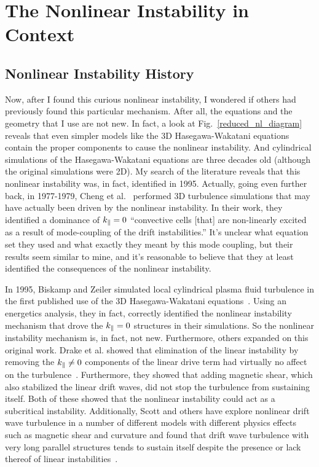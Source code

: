 \section{The Nonlinear Instability in Context}
\label{s_nl_inst_context}

\subsection{Nonlinear Instability History}
\label{ss_nl_history}

Now, after I found this curious nonlinear instability, I wondered if others had previously found this particular mechanism. 
After all, the equations and the geometry that I use are not new. In fact, a look at 
Fig.~\ref{reduced_nl_diagram} reveals that even simpler models like the 3D Hasegawa-Wakatani equations~\cite{hasegawa1983} contain the proper components to cause the nonlinear instability. And 
cylindrical simulations of the Hasegawa-Wakatani equations are three decades old (although the original simulations were 2D).
My search of the literature reveals that this nonlinear instability was, in fact, identified in 1995. Actually, going even further back, in 1977-1979, 
Cheng et al.~\cite{cheng1977,cheng1979} performed 3D turbulence simulations that may have actually been driven by the nonlinear instability. 
In their work, they identified a dominance of $k_\parallel=0$ ``convective cells [that] are non-linearly excited as a result of mode-coupling of the drift instabilities.'' 
It's unclear what equation set they used
and what exactly they meant by this mode coupling, but their results seem similar to mine, and it's reasonable to believe that they at least identified the consequences of the nonlinear instability.

In 1995, Biskamp and Zeiler simulated local cylindrical plasma fluid turbulence in the first published use of the 3D Hasegawa-Wakatani equations~\cite{biskamp1995}. 
Using an energetics analysis, they in fact, correctly identified the nonlinear instability mechanism that drove the $k_\parallel=0$ structures in their simulations. So the nonlinear instability
mechanism is, in fact, not new. Furthermore, others expanded on this original work. 
Drake et al. showed that elimination of the linear instability by removing the $k_\parallel \ne 0$ components of the linear drive term
had virtually no affect on the turbulence~\cite{drake1995}. Furthermore, they showed that adding magnetic shear, which also stabilized the linear drift waves, did not stop the turbulence
from sustaining itself. Both of these showed that the nonlinear instability could act as a subcritical instability.
Additionally, Scott and others have explore nonlinear drift wave turbulence in a number of different models with different physics effects such as magnetic shear and curvature
and found that drift wave turbulence with very long parallel structures tends to sustain itself despite the presence or lack thereof of linear 
instabilities~\cite{scott1990,scott1992,zeiler1996,zeiler1997,korsholm1999,scott2002,scott2003,scott2005}.

